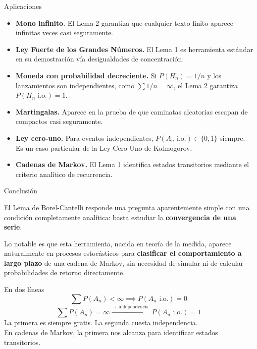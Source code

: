 \documentclass[11pt]{beamer}
\newcommand{\io}{\text{ i.o.}}
\begin{document}
\begin{frame}{Aplicaciones}

  \begin{itemize}
    \item \textbf{Mono infinito.} El Lema 2 garantiza que cualquier texto
          finito aparece infinitas veces casi seguramente.

    \medskip
    \item \textbf{Ley Fuerte de los Grandes Números.} El Lema 1 es
          herramienta estándar en su demostración vía desigualdades de
          concentración.

    \medskip
    \item \textbf{Moneda con probabilidad decreciente.} Si $P(H_n) = 1/n$
          y los lanzamientos son independientes, como $\sum 1/n = \infty$,
          el Lema 2 garantiza $P(H_n \io) = 1$.

    \medskip
    \item \textbf{Martingalas.} Aparece en la prueba de que caminatas
          aleatorias escapan de compactos casi seguramente.

    \medskip
    \item \textbf{Ley cero-uno.} Para eventos independientes,
          $P(A_n \io) \in \{0, 1\}$ siempre. Es un caso particular
          de la Ley Cero-Uno de Kolmogorov.

    \medskip
    \item \textbf{Cadenas de Markov.} El Lema 1 identifica estados
          transitorios mediante el criterio analítico de recurrencia.
  \end{itemize}

\end{frame}

\begin{frame}{Conclusión}

  El Lema de Borel-Cantelli responde una pregunta aparentemente simple
  con una condición completamente analítica: basta estudiar la
  \textbf{convergencia de una serie}.

  \bigskip

  Lo notable es que esta herramienta, nacida en teoría de la medida,
  aparece naturalmente en procesos estocásticos para
  \textbf{clasificar el comportamiento a largo plazo} de una cadena
  de Markov, sin necesidad de simular ni de calcular probabilidades
  de retorno directamente.

  \bigskip

  \begin{block}{En dos líneas}
    \[
      \sum P(A_n) < \infty \implies P(A_n \io) = 0
    \]
    \[
      \sum P(A_n) = \infty \xrightarrow{\;\text{+ independencia}\;} P(A_n \io) = 1
    \]
    La primera es siempre gratis. La segunda cuesta independencia.\\
    En cadenas de Markov, la primera nos alcanza para identificar
    estados transitorios.
  \end{block}

\end{frame}
\end{document}
